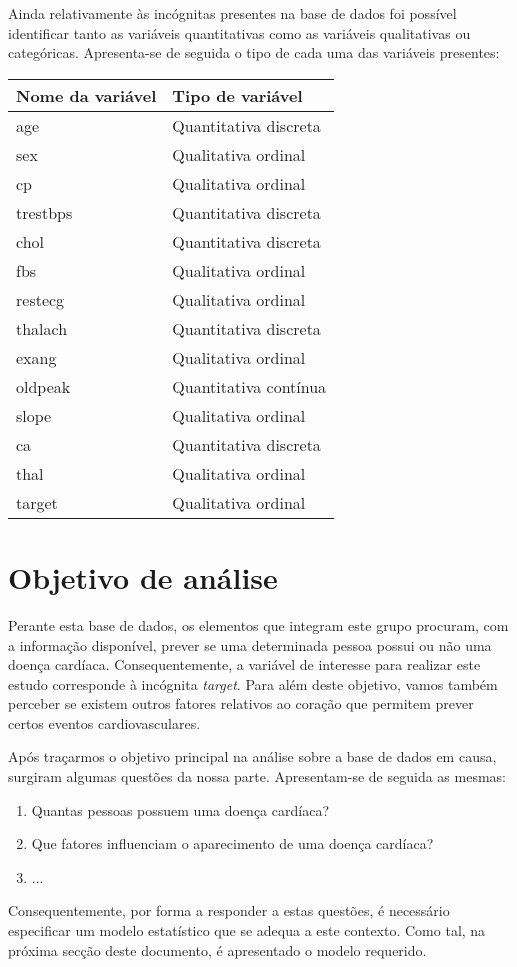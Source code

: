\documentclass[a4paper]{report}
\begin{document}
{	Ainda relativamente às incógnitas presentes na base de dados foi possível identificar tanto as variáveis quantitativas como as variáveis qualitativas ou categóricas. 
	Apresenta-se de seguida o tipo de cada uma das variáveis presentes:
	\begin{center}
		\begin{tabular}{ | l | l | }
		\hline
		\textbf{Nome da variável} & \textbf{Tipo de variável} \\ \hline
		age & Quantitativa discreta \\ \hline
		sex & Qualitativa ordinal \\ \hline
		cp & Qualitativa ordinal \\ \hline
		trestbps & Quantitativa discreta \\ \hline
		chol & Quantitativa discreta \\ \hline
		fbs & Qualitativa ordinal \\ \hline
		restecg & Qualitativa ordinal \\ \hline
		thalach & Quantitativa discreta \\ \hline
		exang & Qualitativa ordinal \\ \hline
		oldpeak & Quantitativa contínua \\ \hline
		slope & Qualitativa ordinal \\ \hline
		ca & Quantitativa discreta \\ \hline
		thal & Qualitativa ordinal \\ \hline
		target & Qualitativa ordinal \\ \hline
		\end{tabular}
	\end{center}
	
	\section{Objetivo de análise}
	Perante esta base de dados, os elementos que integram este grupo procuram, com a informação disponível, prever se uma determinada pessoa possui ou não uma doença cardíaca. Consequentemente,
	a variável de interesse para realizar este estudo corresponde à incógnita \textit{target}.
	Para além deste objetivo, vamos também perceber se existem outros fatores relativos ao coração que permitem prever certos eventos cardiovasculares. 
	
	Após traçarmos o objetivo principal na análise sobre a base de dados em causa, surgiram algumas questões da nossa parte. Apresentam-se de seguida as mesmas:
	\begin{enumerate}
	    \item Quantas pessoas possuem uma doença cardíaca?
	    \item Que fatores influenciam o aparecimento de uma doença cardíaca?
	    \item ...
	\end{enumerate}
	
	Consequentemente, por forma a responder a estas questões, é necessário especificar um modelo estatístico que se adequa a este contexto. Como tal, na próxima secção deste documento, 
	é apresentado o modelo requerido.
}
\end{document}

